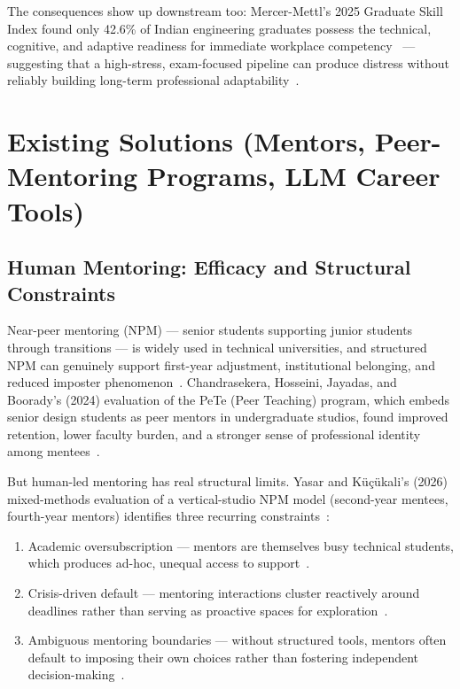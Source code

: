 The consequences show up downstream too: Mercer-Mettl's 2025 Graduate Skill Index found only 42.6\% of Indian engineering graduates possess the technical, cognitive, and adaptive readiness for immediate workplace competency~\cite{MercerMettl-2025} --- suggesting that a high-stress, exam-focused pipeline can produce distress without reliably building long-term professional adaptability~\cite{MercerMettl-2025, Maji-2024}.

\section{Existing Solutions (Mentors, Peer-Mentoring Programs, LLM Career Tools)}

\subsection{Human Mentoring: Efficacy and Structural Constraints}

Near-peer mentoring (NPM) --- senior students supporting junior students through transitions --- is widely used in technical universities, and structured NPM can genuinely support first-year adjustment, institutional belonging, and reduced imposter phenomenon~\cite{Chandrasekera-2024, Yasar-2026}. Chandrasekera, Hosseini, Jayadas, and Boorady's (2024) evaluation of the PeTe (Peer Teaching) program, which embeds senior design students as peer mentors in undergraduate studios, found improved retention, lower faculty burden, and a stronger sense of professional identity among mentees~\cite{Chandrasekera-2024}.

But human-led mentoring has real structural limits. Yasar and K\"{u}\c{c}\"{u}kali's (2026) mixed-methods evaluation of a vertical-studio NPM model (second-year mentees, fourth-year mentors) identifies three recurring constraints~\cite{Yasar-2026}:

\begin{enumerate}
    \item Academic oversubscription --- mentors are themselves busy technical students, which produces ad-hoc, unequal access to support~\cite{Yasar-2026}.
    \item Crisis-driven default --- mentoring interactions cluster reactively around deadlines rather than serving as proactive spaces for exploration~\cite{Yasar-2026}.
    \item Ambiguous mentoring boundaries --- without structured tools, mentors often default to imposing their own choices rather than fostering independent decision-making~\cite{Yasar-2026}.
\end{enumerate}

